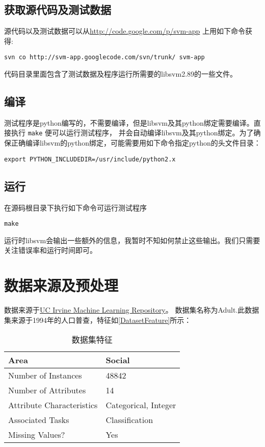 \documentclass[a4paper]{article}
\begin{document}
\subsection{获取源代码及测试数据}
源代码以及测试数据可以从\href{http://code.google.com/p/svm-app}{http://code.google.com/p/svm-app} 上用如下命令获得:
\begin{Verbatim}[frame=single]
svn co http://svm-app.googlecode.com/svn/trunk/ svm-app
\end{Verbatim}
代码目录里面包含了测试数据及程序运行所需要的libsvm2.89的一些文件。
\subsection{编译}
测试程序是python编写的，不需要编译，但是libsvm及其python绑定需要编译。直接执行 \verb!make! 便可以运行测试程序，
并会自动编译libsvm及其python绑定。为了确保正确编译libsvm的python绑定，可能需要用如下命令指定python的头文件目录：
\begin{Verbatim}[frame=single]
export PYTHON_INCLUDEDIR=/usr/include/python2.x
\end{Verbatim}
\subsection{运行}
在源码根目录下执行如下命令可运行测试程序
\begin{Verbatim}[frame=single]
make
\end{Verbatim}
运行时libsvm会输出一些额外的信息，我暂时不知如何禁止这些输出。我们只需要关注错误率和运行时间即可。
\section{数据来源及预处理}
数据来源于\href{http://archive.ics.uci.edu/ml/datasets/Adult}{UC Irvine Machine Learning Repository}。
数据集名称为Adult.此数据集来源于1994年的人口普查，特征如\autoref{DatasetFeature}所示：
\begin{table}[h]
\centering
\begin{tabular}{l|l}
Area& Social\\ \hline
Number of Instances& 48842\\ \hline
Number of Attributes& 14\\ \hline
Attribute Characteristics& Categorical, Integer\\ \hline
Associated Tasks& Classification\\ \hline
Missing Values? & Yes\\
\end{tabular}
\caption{数据集特征}
\label{DatasetFeature}
\end{table}
\end{document}
